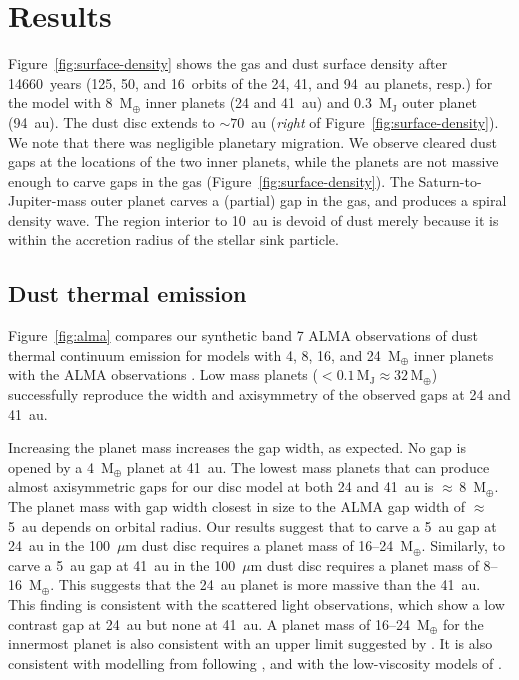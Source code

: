\documentclass[usenatbib,a4paper,times]{mnras}
\renewcommand{\earth}{\mathrm{M}_{\oplus}}
\begin{document}
\section{Results}
\label{sec:results}

Figure~\ref{fig:surface-density} shows the gas and dust surface density after
14660~years (125, 50, and 16~orbits of the 24, 41, and 94~au planets, resp.) for
the model with 8~$\earth{}$ inner planets (24 and 41~au) and 0.3~$\mathrm{M_J}$
outer planet (94~au). The dust disc extends to $\sim 70$~au (\textit{right} of
Figure~\ref{fig:surface-density}). We note that there was negligible planetary
migration. We observe cleared dust gaps at the locations of the two inner
planets, while the planets are not massive enough to carve gaps in the gas
(Figure~\ref{fig:surface-density}). The Saturn-to-Jupiter-mass outer planet
carves a (partial) gap in the gas, and produces a spiral density wave. The
region interior to 10~au is devoid of dust merely because it is within the
accretion radius of the stellar sink particle.





\subsection{Dust thermal emission}

Figure~\ref{fig:alma} compares our synthetic band 7 ALMA observations of dust
thermal continuum emission for models with 4, 8, 16, and 24~$\earth{}$ inner
planets with the ALMA observations \citep{andrews:2016}. Low mass planets ($<
0.1\,\mathrm{M_J} \approx 32\,\earth{}$) successfully reproduce the width and
axisymmetry of the observed gaps at 24 and 41~au.

Increasing the planet mass increases the gap width, as expected. No gap is
opened by a 4~$\earth{}$ planet at 41~au. The lowest mass planets that can
produce almost axisymmetric gaps for our disc model at both 24 and 41~au is
$\approx\,$8~$\earth{}$. The planet mass with gap width closest in size to the
ALMA gap width of $\approx\,$5~au depends on orbital radius. Our results suggest
that to carve a 5~au gap at 24~au in the 100~$\mu$m dust disc requires a planet
mass of 16--24~$\earth{}$. Similarly, to carve a 5~au gap at 41~au in the
100~$\mu$m dust disc requires a planet mass of 8--16~$\earth{}$. This suggests
that the 24~au planet is more massive than the 41~au. This finding is consistent
with the scattered light observations, which show a low contrast gap at 24~au
but none at 41~au. A planet mass of 16--24~$\earth{}$ for the innermost planet
is also consistent with an upper limit suggested by \citet{nomura:2016}. It is
also consistent with modelling from \citet{van-boekel:2017} following
\citet{duffell:2015}, and with the low-viscosity models of \citet{dong:2017b}.
\end{document}
